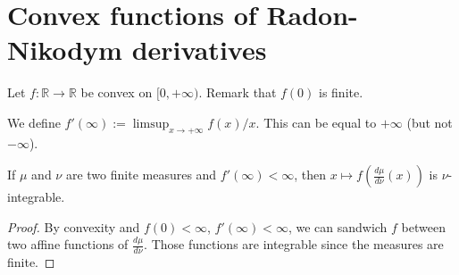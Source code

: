 \chapter{Convex functions of Radon-Nikodym derivatives}

Let $f : \mathbb{R} \to \mathbb{R}$ be convex on $[0, +\infty)$. Remark that $f(0)$ is finite.

\begin{definition}
  \label{def:derivAtTop}
  \leanok
  We define $f'(\infty) := \limsup_{x \to + \infty} f(x)/x$. This can be equal to $+\infty$ (but not $-\infty$).
\end{definition}

\begin{lemma}
  \label{lem:integrable_f_rnDeriv_of_derivAtTop_ne_top}
  \leanok
  If $\mu$ and $\nu$ are two finite measures and $f'(\infty) < \infty$, then $x \mapsto f\left(\frac{d\mu}{d\nu}(x)\right)$ is $\nu$-integrable. 
\end{lemma}

\begin{proof} \leanok
By convexity and $f(0) < \infty$, $f'(\infty)<\infty$, we can sandwich $f$ between two affine functions of $\frac{d\mu}{d\nu}$.
Those functions are integrable since the measures are finite.
\end{proof}